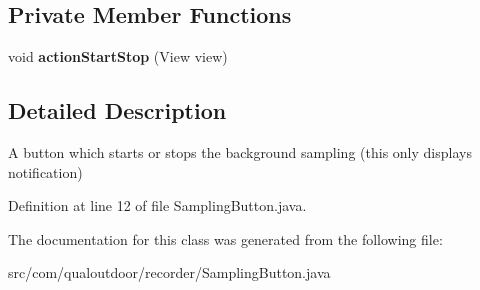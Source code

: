 \subsection*{Private Member Functions}
\begin{DoxyCompactItemize}
\item 
\hypertarget{classcom_1_1qualoutdoor_1_1recorder_1_1SamplingButton_a7ef3a0d5d2622d8597285e4812e19e22}{void {\bfseries action\-Start\-Stop} (View view)}\label{classcom_1_1qualoutdoor_1_1recorder_1_1SamplingButton_a7ef3a0d5d2622d8597285e4812e19e22}

\end{DoxyCompactItemize}


\subsection{Detailed Description}
A button which starts or stops the background sampling (this only displays notification) 

Definition at line 12 of file Sampling\-Button.\-java.



The documentation for this class was generated from the following file\-:\begin{DoxyCompactItemize}
\item 
src/com/qualoutdoor/recorder/Sampling\-Button.\-java\end{DoxyCompactItemize}
